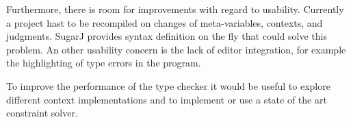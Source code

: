 Furthermore, there is room for improvements with regard to
usability. Currently a project hast to be recompiled on changes of
meta-variables, contexts, and judgments. SugarJ\cite{erdweg2011sugarj}
provides syntax definition on the fly that could solve this
problem. An other usability concern is the lack of editor integration,
for example the highlighting of type errors in the program.

To improve the performance of the type checker it would be useful to
explore different context implementations and to implement or use a
state of the art constraint solver.

